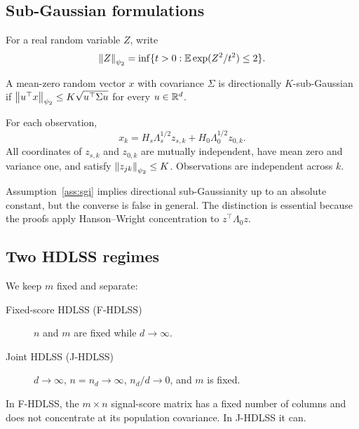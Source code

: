 \subsection{Sub-Gaussian formulations}
For a real random variable $Z$, write
\begin{equation}
\left\lVert Z\right\rVert_{\psi_2}=\inf\{t>0:\mathbb{E}\exp(Z^2/t^2)\le2\}.
\end{equation}
\begin{definition}
A mean-zero random vector $x$ with covariance $\Sigma$ is directionally $K$-sub-Gaussian if $\left\lVert u^\top x\right\rVert_{\psi_2}\le K\sqrt{u^\top\Sigma u}$ for every $u\in\mathbb{R}^d$.
\end{definition}
\begin{assumption}\label{ass:sgi}
For each observation,
\begin{equation}\label{eq:factor}
x_k=H_s\Lambda_s^{1/2}z_{s,k}+H_0\Lambda_0^{1/2}z_{0,k}.
\end{equation}
All coordinates of $z_{s,k}$ and $z_{0,k}$ are mutually independent, have mean zero and variance one, and satisfy $\left\lVert z_{jk}\right\rVert_{\psi_2}\le K$.  Observations are independent across $k$.
\end{assumption}
Assumption~\ref{ass:sgi} implies directional sub-Gaussianity up to an absolute constant, but the converse is false in general.  The distinction is essential because the proofs apply Hanson--Wright concentration to $z^\top\Lambda_0z$.

\subsection{Two HDLSS regimes}
We keep $m$ fixed and separate:
\begin{description}
\item[Fixed-score HDLSS (F-HDLSS)] $n$ and $m$ are fixed while $d\to\infty$.
\item[Joint HDLSS (J-HDLSS)] $d\to\infty$, $n=n_d\to\infty$, $n_d/d\to0$, and $m$ is fixed.
\end{description}
In F-HDLSS, the $m\times n$ signal-score matrix has a fixed number of columns and does not concentrate at its population covariance.  In J-HDLSS it can.

